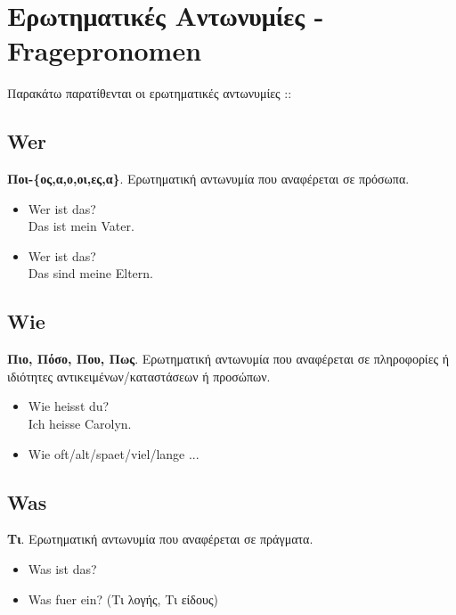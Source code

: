 

\section{Ερωτηματικές Αντωνυμίες - Fragepronomen}

Παρακάτω παρατίθενται οι ερωτηματικές αντωνυμίες ::

\subsection{Wer}

\textbf{Ποι-\{ος,α,ο,οι,ες,α\}}. Ερωτηματική αντωνυμία που αναφέρεται σε πρόσωπα. \\ 

\begin{itemize}
 \item Wer ist das? \\ Das ist mein Vater.
 \item Wer ist das? \\ Das sind meine Eltern.
\end{itemize}


\subsection{Wie}

\textbf{Πιο, Πόσο, Που, Πως}. Ερωτηματική αντωνυμία που αναφέρεται σε πληροφορίες ή ιδιότητες αντικειμένων/καταστάσεων ή προσώπων. \\

\begin{itemize}
 \item Wie heisst du? \\ Ich heisse Carolyn.
 \item Wie oft/alt/spaet/viel/lange ...
\end{itemize}


\subsection{Was}

\textbf{Τι}. Ερωτηματική αντωνυμία που αναφέρεται σε πράγματα. \\ 

\begin{itemize}
 \item Was ist das? 
 \item Was fuer ein? (Τι λογής, Τι είδους)
\end{itemize}


